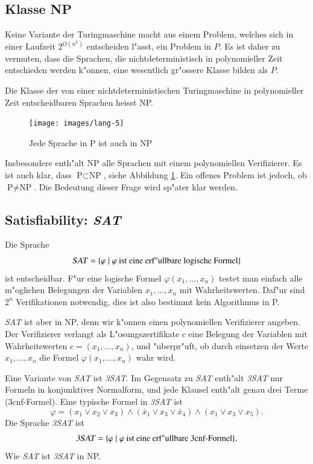 \subsection{Klasse NP}
Keine Variante der Turingmaschine macht aus einem Problem,
welches sich in einer Laufzeit $2^{O(n^k)}$ entscheiden
l"asst, ein Problem in $P$. Es ist daher zu vermuten,
dass die Sprachen, die nichtdeterministisch in polynomieller
Zeit entschieden werden k"onnen, eine wesentlich gr"ossere
Klasse bilden als $P$.

\begin{definition}
Die Klasse der von einer nichtdeterministischen Turingmaschine
in polynomieller Zeit entscheidbaren Sprachen heisst NP.
\end{definition}

\begin{figure}
\begin{center}
\texttt{[image: images/lang-5]}
\end{center}
\caption{Jede Sprache in P ist auch in NP\label{psubsetnp}}
\end{figure}%

Insbesondere enth"alt NP alle Sprachen mit einem polynomiellen
Verifizierer. Es ist auch klar, dass $\text{P}\subset\text{NP}$,
siehe Abbildung \ref{psubsetnp}.
Ein offenes Problem ist jedoch, ob $\text{P}\ne \text{NP}$.
Die Bedeutung dieser Frage wird sp"ater klar werden.

\subsection{Satisfiability: \textsl{SAT}}
Die Sprache 
\[
\text{\textsl{SAT}}=\{\varphi\;|\;\text{$\varphi$ ist eine erf"ullbare logische Formel}\}
\]
ist entscheidbar. F"ur eine logische Formel $\varphi(x_1,\dots,x_n)$
testet man einfach alle m"oglichen Belegungen der Variablen $x_1,\dots,x_n$
mit Wahrheitswerten.
Daf"ur sind $2^n$ Verifikationen notwendig, dies ist also
bestimmt kein Algorithmus in P.

\textsl{SAT} ist aber in NP,
denn wir k"onnen einen polynomiellen Verifizierer angeben.
Der Verifizierer verlangt als L"osungszertifikate $c$ eine
Belegung der Variablen mit Wahrheitswerten $c=(x_1,\dots,x_n)$,
und "uberpr"uft, ob durch einsetzen der Werte $x_1,\dots,x_n$
die Formel $\varphi(x_1,\dots,x_n)$ wahr wird.

Eine Variante von \textsl{SAT} ist \textsl{3SAT}.
Im Gegensatz zu \textsl{SAT} enth"alt \textsl{3SAT}
nur Formeln in konjunktiver Normalform, und jede Klausel
enth"alt genau drei Terme (3cnf-Formel).
Eine typische Formel in \textsl{3SAT} ist 
\[
\varphi=(x_1\vee x_2\vee x_3)\wedge (\bar x_1\vee x_3\vee \bar x_4)\wedge
	(x_1\vee x_3\vee x_5).
\]
Die Sprache \textsl{3SAT} ist
\[
\text{\textsl{3SAT}} =\{\varphi\;|\; \text{$\varphi$ ist eine erf"ullbare 3cnf-Formel}\}.
\]
Wie \textsl{SAT} ist \textsl{3SAT} in NP.

